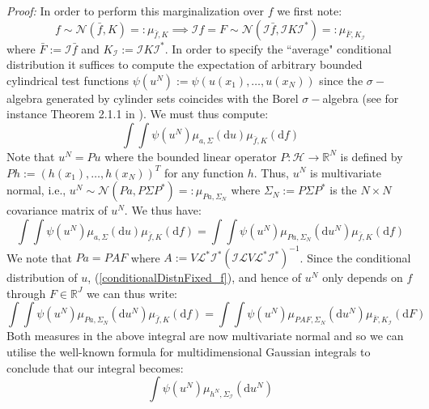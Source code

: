 \noindent \textit{Proof:}
In order to perform this marginalization over $f$ we first note:
\begin{equation}
    f\sim\mathcal{N}(\bar{f},K)=:\mu_{\bar{f},K} \implies \mathcal{I}f=F\sim\mathcal{N}(\mathcal{I}\bar{f},\mathcal{I}K\mathcal{I}^{*})=:\mu_{\bar{F},K_{\mathcal{I}}}
\end{equation}
where $\bar{F}:=\mathcal{I}\bar{f}$ and $K_{\mathcal{I}}:=\mathcal{I}K\mathcal{I}^{*}$. In order to specify the ``average" conditional distribution it suffices to compute the expectation of arbitrary bounded cylindrical test functions $\psi(u^{N}):=\psi(u(x_1),\dots,u(x_{N}))$ since the $\sigma-$algebra generated by cylinder sets coincides with the Borel $\sigma-$algebra (see for instance Theorem 2.1.1 in \textcolor{blue}{\cite{lunardi2015infinite}}). We must thus compute:
\begin{equation}
    \int\int\psi(u^{N})\mu_{a,\Sigma}(\mathrm{d}u)\mu_{\bar{f},K}(\mathrm{d}f)
\end{equation}
Note that $u^{N}=Pu$ where the bounded linear operator $P:\mathcal{H}\rightarrow\mathbb{R}^{N}$ is defined by $Ph:=(h(x_1),\dots,h(x_N))^T$ for any function $h$. Thus, $u^{N}$ is multivariate normal, i.e., $u^{N}\sim\mathcal{N}(Pa,P\Sigma P^{*})=:\mu_{Pa,\Sigma_{N}}$ where $\Sigma_{N}:=P\Sigma P^{*}$ is the $N\times N$ covariance matrix of $u^{N}$. We thus have:
\begin{equation}
    \int\int\psi(u^{N})\mu_{a,\Sigma}(\mathrm{d}u)\mu_{\bar{f},K}(\mathrm{d}f) = \int\int\psi(u^{N})\mu_{Pa,\Sigma_N}(\mathrm{d}u^{N})\mu_{\bar{f},K}(\mathrm{d}f)
\end{equation}
We note that $Pa=PAF$ where $A:= V\mathcal{L}^{*}\mathcal{I}^{*}(\mathcal{I}\mathcal{L}V\mathcal{L}^{*}\mathcal{I}^{*})^{-1}$. Since the conditional distribution of $u$, (\ref{conditionalDistnFixed_f}), and hence of $u^{N}$ only depends on $f$ through $F\in\mathbb{R}^{J}$ we can thus write:
\begin{equation}
    \int\int\psi(u^{N})\mu_{Pa,\Sigma_N}(\mathrm{d}u^{N})\mu_{\bar{f},K}(\mathrm{d}f)=\int\int\psi(u^{N})\mu_{PAF,\Sigma_N}(\mathrm{d}u^{N})\mu_{\bar{F},K_{\mathcal{I}}}(\mathrm{d}F)
\end{equation}
Both measures in the above integral are now multivariate normal and so we can utilise the well-known formula for multidimensional Gaussian integrals to conclude that our integral becomes:
\begin{equation}
    \int\psi(u^{N})\mu_{h^{N},\Sigma_{\mathcal{I}}}(\mathrm{d}u^{N})
\end{equation}
